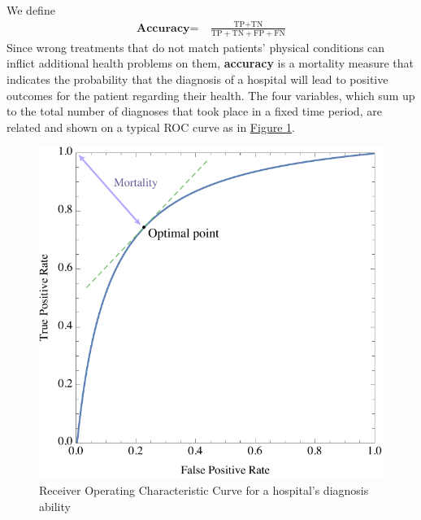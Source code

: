 \documentclass{article}
\begin{document}
We define
\begin{align}
\textbf{Accuracy} = &\ \frac{\text{TP} + \text{TN}}{\text{TP} + \text{TN} + \text{FP} + \text{FN}}
\end{align}
Since wrong treatments that do not match patients' physical conditions can inflict additional health problems on them, \textbf{accuracy} is a mortality measure that indicates the probability that the diagnosis of a hospital will lead to positive outcomes for the patient regarding their health. The four variables, which sum up to the total number of diagnoses that took place in a fixed time period, are related and shown on a typical ROC curve as in \hyperref[fig:roc]{Figure \ref*{fig:roc}}.

\begin{figure}[htbp]
    \centering
    \includegraphics[scale=.78]{ROC.pdf}
    \caption{Receiver Operating Characteristic Curve for a hospital's diagnosis ability}
    \label{fig:roc}
\end{figure}
\end{document}

